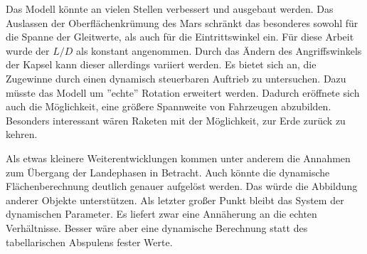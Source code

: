 \label{sec:ausblick}Das Modell könnte an vielen Stellen verbessert und ausgebaut werden. Das Auslassen der Oberflächenkrümung des Mars schränkt das besonderes sowohl für die Spanne der Gleitwerte, als auch für die Eintrittswinkel ein. Für diese Arbeit wurde der $L/D$ als konstant angenommen. Durch das Ändern des Angriffswinkels der Kapsel kann dieser allerdings variiert werden. Es bietet sich an, die Zugewinne durch einen dynamisch steuerbaren Auftrieb zu untersuchen. Dazu müsste das Modell um ''echte'' Rotation erweitert werden. Dadurch eröffnete sich auch die Möglichkeit, eine größere Spannweite von Fahrzeugen abzubilden. Besonders interessant wären Raketen mit der Möglichkeit, zur Erde zurück zu kehren.

Als etwas kleinere Weiterentwicklungen kommen unter anderem die Annahmen zum Übergang der Landephasen in Betracht. Auch könnte die dynamische Flächenberechnung deutlich genauer aufgelöst werden. Das würde die Abbildung anderer Objekte unterstützen. Als letzter großer Punkt bleibt das System der dynamischen Parameter. Es liefert zwar eine Annäherung an die echten Verhältnisse. Besser wäre aber eine dynamische Berechnung statt des tabellarischen Abspulens fester Werte.